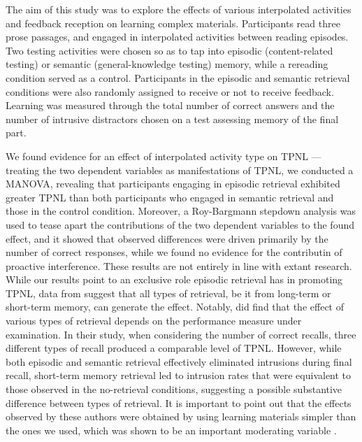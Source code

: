 \documentclass[../main.tex]{subfiles}
\begin{document}
The aim of this study was to explore the effects of various interpolated 
activities and feedback reception on learning complex materials. Participants 
read three prose passages, and engaged in interpolated activities between 
reading episodes. Two testing activities were chosen so as to tap into episodic 
(content-related testing) or semantic (general-knowledge testing) memory, while 
a rereading condition served as a control. Participants in the episodic and 
semantic retrieval conditions were also randomly assigned to receive or not to 
receive feedback. Learning was measured through the total number of correct 
answers and the number of intrusive distractors chosen on a test assessing 
memory of the final part.

We found evidence for an effect of interpolated activity type on TPNL --- 
treating the two dependent variables as manifestations of TPNL, we conducted a 
MANOVA, revealing that participants engaging in episodic retrieval exhibited 
greater TPNL than both participants who engaged in semantic retrieval and those 
in the control condition. Moreover, a Roy-Bargmann stepdown analysis was used 
to tease apart the contributions of the two dependent variables to the found 
effect, and it showed that observed differences were driven primarily by the 
number of correct responses, while we found no evidence for the contributin of 
proactive interference. These results are not entirely in line with extant 
research. While our results point to an exclusive role episodic retrieval has 
in promoting TPNL, data from \cite{pastotterRetrievalLearningFacilitates2011} 
suggest that all types of retrieval, be it from long-term or short-term memory, 
can generate the effect. Notably, 
\cite{pastotterRetrievalLearningFacilitates2011} did find that the effect of 
various types of retrieval depends on the performance measure under 
examination. In their study, when considering the number of correct recalls, 
three different types of recall produced a comparable level of TPNL. However, 
while both episodic and semantic retrieval effectively eliminated intrusions 
during final recall, short-term memory retrieval led to intrusion rates that 
were equivalent to those observed in the no-retrieval conditions, suggesting a 
possible substantive difference between types of retrieval. It is important to 
point out that the effects observed by these authors were obtained by using 
learning materials simpler than the ones we used, which was shown to be an 
important moderating variable \cite{chanRetrievalPotentiatesNew2018}.
\end{document}
